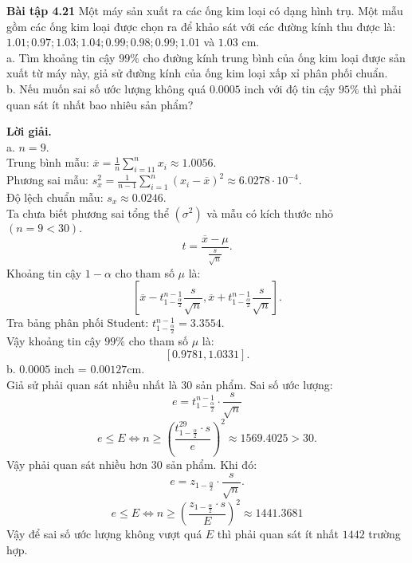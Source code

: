 \documentclass[12pt,a4paper]{article}
\begin{document}
\begin{mybox}
\textbf{Bài tập 4.21} Một máy sản xuất ra các ống kim loại có dạng hình trụ. Một mẫu gồm các ống kim loại được chọn ra để khảo sát với các đường kính thu được là: $1.01; 0.97; 1.03; 1.04; 0.99; 0.98; 0.99; 1.01$ và $1.03$ $\mathrm{cm}.$\\
a. Tìm khoảng tin cậy $99\%$ cho đường kính trung bình của ống kim loại được sản xuất từ máy này, giả sử đường kính của ống kim loại xấp xỉ phân phối chuẩn.\\
b. Nếu muốn sai số ước lượng không quá $0.0005$ inch với độ tin cậy $95\%$ thì phải quan sát ít nhất bao nhiêu sản phẩm?
\end{mybox}
\textbf{Lời giải.}\\
a. $n = 9.$\\
Trung bình mẫu:
$\overline x  = \frac{1}{n}\sum\limits_{i =1 1}^n {{x_i}}  \approx 1.0056.$\\
Phương sai mẫu: $s_x^2 = \frac{1}{{n - 1}}\sum\limits_{i = 1}^n {{{\left( {{x_i} - \overline x } \right)}^2}}  \approx 6.0278 \cdot 10^{-4}.$\\
Độ lệch chuẩn mẫu: ${s_x} \approx 0.0246.$\\
Ta chưa biết phương sai tổng thể $\left( {\sigma^2} \right)$ và mẫu có kích thước nhỏ $\left( {n = 9 < 30} \right).$
$$t = \frac{\overline{x} - \mu}{\frac{s}{\sqrt{n}}}.$$
Khoảng tin cậy $1 - \alpha$ cho tham số $\mu$ là:
$$\left[ {\overline x  - t_{1 - \frac{\alpha }{2}}^{n - 1}\frac{s}{{\sqrt n }},\overline x  + t_{1 - \frac{\alpha }{2}}^{n - 1}\frac{s}{{\sqrt n }}} \right].$$
Tra bảng phân phối Student: $t_{1 - \frac{\alpha }{2}}^{n - 1} = 3.3554.$\\
Vậy khoảng tin cậy $99\%$ cho tham số $\mu$ là:
$$\left[ {0.9781, 1.0331} \right].$$
b. $0.0005$ inch = $0.00127 \mathrm{cm}.$\\ 
Giả sử phải quan sát nhiều nhất là $30$ sản phẩm. Sai số ước lượng:
$$e = t_{1 - \frac{\alpha }{2}}^{n - 1} \cdot \frac{s}{{\sqrt n }}$$
$$e \leqslant E \Leftrightarrow n \geqslant {\left( {\frac{{t_{1 - \frac{\alpha }{2}}^{29} \cdot s}}{e}} \right)^2} \approx 1569.4025 > 30.$$
Vậy phải quan sát nhiều hơn $30$ sản phẩm. Khi đó:
$$e = z_{1 - \frac{\alpha}{2}} \cdot \frac{s}{\sqrt{n}}.$$
$$e \leqslant E \Leftrightarrow n \geqslant {\left( {\frac{{{z_{1 - \frac{\alpha }{2}}} \cdot s}}{E}} \right)^2} \approx 1441.3681$$
Vậy để sai số ước lượng không vượt quá $E$ thì phải quan sát ít nhất $1442$ trường hợp.
\end{document}
